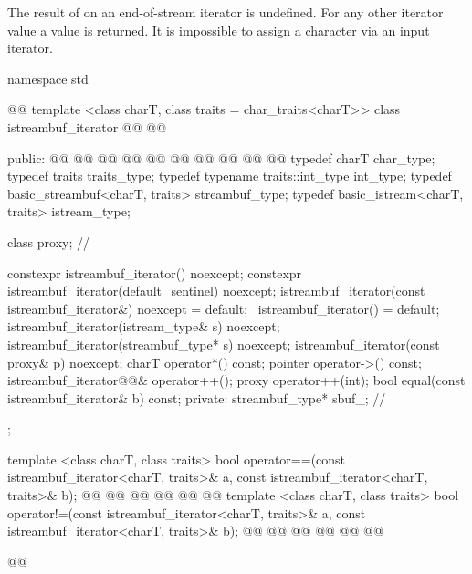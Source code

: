 \pnum
The result of
on an end-of-stream iterator is undefined.
%
For any other iterator value a
value is returned.
It is impossible to assign a character via an input iterator.

%

\begin{codeblock}
namespace std { @@
  template <class charT, class traits = char_traits<charT>>
  class istreambuf_iterator
     @@
                       @@ {
  public:
    @@             @@
    @@                          @@
    @@      @@
    @@                          @@
    @@                   @@
    typedef charT                          char_type;
    typedef traits                         traits_type;
    typedef typename traits::int_type      int_type;
    typedef basic_streambuf<charT, traits> streambuf_type;
    typedef basic_istream<charT, traits>   istream_type;

    class proxy;                           // \expos

    constexpr istreambuf_iterator() noexcept;
    constexpr istreambuf_iterator(default_sentinel) noexcept;
    istreambuf_iterator(const istreambuf_iterator&) noexcept = default;
    ~istreambuf_iterator() = default;
    istreambuf_iterator(istream_type& s) noexcept;
    istreambuf_iterator(streambuf_type* s) noexcept;
    istreambuf_iterator(const proxy& p) noexcept;
    charT operator*() const;
    pointer operator->() const;
    istreambuf_iterator@@& operator++();
    proxy operator++(int);
    bool equal(const istreambuf_iterator& b) const;
  private:
    streambuf_type* sbuf_;                // \expos
  };

  template <class charT, class traits>
    bool operator==(const istreambuf_iterator<charT, traits>& a,
            const istreambuf_iterator<charT, traits>& b);
  @@
    @@
            @@
  @@
    @@
            @@
  template <class charT, class traits>
    bool operator!=(const istreambuf_iterator<charT, traits>& a,
            const istreambuf_iterator<charT, traits>& b);
  @@
    @@
            @@
  @@
    @@
            @@
}@\added{\}\}\}}@
\end{codeblock}

